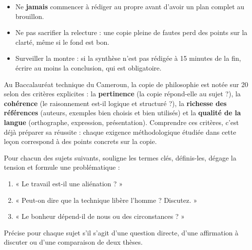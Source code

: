 \documentclass[11pt]{article}
\begin{document}
\begin{attention}
\begin{itemize}
\item Ne \textbf{jamais} commencer à rédiger au propre avant d'avoir un plan complet au brouillon.
\item Ne pas sacrifier la relecture : une copie pleine de fautes perd des points sur la clarté, même si le fond est bon.
\item Surveiller la montre : si la synthèse n'est pas rédigée à 15 minutes de la fin, écrire au moins la conclusion, qui est obligatoire.
\end{itemize}
\end{attention}

\begin{savaistu}
Au Baccalauréat technique du Cameroun, la copie de philosophie est notée sur 20 selon des critères explicites : la \textbf{pertinence} (la copie répond-elle au sujet ?), la \textbf{cohérence} (le raisonnement est-il logique et structuré ?), la \textbf{richesse des références} (auteurs, exemples bien choisis et bien utilisés) et la \textbf{qualité de la langue} (orthographe, expression, présentation). Comprendre ces critères, c'est déjà préparer sa réussite : chaque exigence méthodologique étudiée dans cette leçon correspond à des points concrets sur la copie.
\end{savaistu}

\begin{exercice}
Pour chacun des sujets suivants, souligne les termes clés, définis-les, dégage la tension et formule une problématique :
\begin{enumerate}
\item « Le travail est-il une aliénation ? »
\item « Peut-on dire que la technique libère l'homme ? Discutez. »
\item « Le bonheur dépend-il de nous ou des circonstances ? »
\end{enumerate}
Précise pour chaque sujet s'il s'agit d'une question directe, d'une affirmation à discuter ou d'une comparaison de deux thèses.
\end{exercice}
\end{document}
